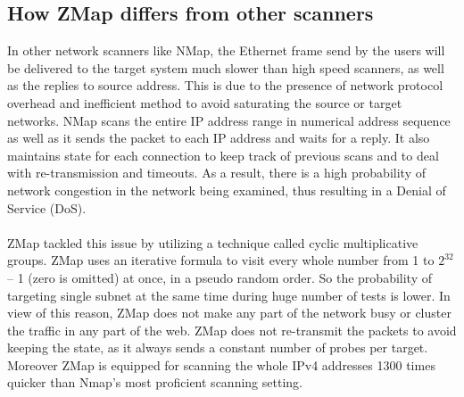 	\subsection{How ZMap differs from other scanners}
	In other network scanners like NMap, the Ethernet frame send by the users will be delivered to the target system much slower than high speed scanners, as well as the replies to source address.
	This is  due to the presence of network protocol overhead and inefficient method to avoid saturating the source or target networks.
	NMap scans the entire IP address range in numerical address sequence as well as it sends the packet to each IP address and waits for a reply.
	It also maintains state for each connection to keep track of previous scans and to deal with re-transmission and timeouts.
	As a result, there is a high probability of network congestion in the network being examined, thus resulting in a Denial of Service (DoS).\\\\
	ZMap tackled this issue by utilizing a technique called cyclic multiplicative groups.
	ZMap uses an iterative formula to visit every whole number from 1 to {$2^{32}$ – 1} (zero is omitted) at once, in a pseudo random order.
	So the probability of targeting single subnet at the same time during huge number of tests is lower.
	In view of this reason, ZMap does not make any part of the network busy or cluster the traffic in any part of the web.
	ZMap does not re-transmit the packets to avoid keeping the state, as it always sends a constant number of probes per target.
	Moreover ZMap is equipped for scanning the whole IPv4 addresses 1300 times quicker than Nmap's most proficient scanning setting.
